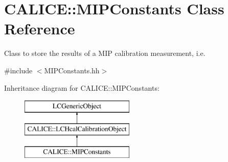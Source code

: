 \section{C\-A\-L\-I\-C\-E\-:\-:M\-I\-P\-Constants Class Reference}
\label{classCALICE_1_1MIPConstants}


Class to store the results of a M\-I\-P calibration measurement, i.\-e.  




{\ttfamily \#include $<$M\-I\-P\-Constants.\-hh$>$}

Inheritance diagram for C\-A\-L\-I\-C\-E\-:\-:M\-I\-P\-Constants\-:\begin{figure}[H]
\begin{center}
\leavevmode
\includegraphics[height=3.000000cm]{classCALICE_1_1MIPConstants}
\end{center}
\end{figure}
